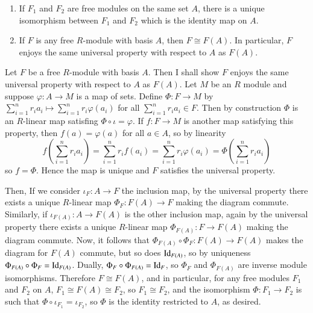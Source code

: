 \documentclass[12pt, a4paper, twoside, openright, titlepage]{book}
\begin{document}
\begin{cor}{}{}
    \leavevmode
    \begin{enumerate}
        \item If $F_1$ and $F_2$ are free modules on the same set $A$, there is a unique isomorphism between $F_1$ and $F_2$ which is the identity map on $A$.
        \item If $F$ is any free $R$-module with basis $A$, then $F\cong F(A)$. In particular, $F$ enjoys the same universal property with respect to $A$ as $F(A)$.
    \end{enumerate}
\end{cor}
\begin{proof*}{}{}
    Let $F$ be a free $R$-module with basis $A$. Then I shall show $F$ enjoys the same universal property with respect to $A$ as $F(A)$. Let $M$ be an $R$ module and suppose $\varphi:A\rightarrow M$ is a map of sets. Define $\Phi:F\rightarrow M$ by $\sum_{i=1}^nr_ia_i \mapsto \sum_{i=1}^nr_i\varphi(a_i)$ for all $\sum_{i=1}^nr_ia_i \in F$. Then by construction $\Phi$ is an $R$-linear map satisfing $\Phi\circ \iota = \varphi$. If $f:F\rightarrow M$ is another map satisfying this property, then $f(a) = \varphi(a)$ for all $a \in A$, so by linearity $$f\left(\sum_{i=1}^nr_ia_i\right) = \sum_{i=1}^nr_if(a_i) = \sum_{i=1}^nr_i\varphi(a_i) = \Phi\left(\sum_{i=1}^nr_ia_i\right)$$
    so $f = \Phi$. Hence the map is unique and $F$ satisfies the universal property. 

    Then, If we consider $\iota_F:A\rightarrow F$ the inclusion map, by the universal property there exists a unique $R$-linear map $\Phi_F:F(A) \rightarrow F$ making the diagram commute. Similarly, if $\iota_{F(A)}:A\rightarrow F(A)$ is the other inclusion map, again by the universal property there exists a unique $R$-linear map $\Phi_{F(A)}:F\rightarrow F(A)$ making the diagram commute. Now, it follows that $\Phi_{F(A)}\circ \Phi_F:F(A) \rightarrow F(A)$ makes the diagram for $F(A)$ commute, but so does $\operatorname{Id}_{F(A)}$, so by uniqueness $\Phi_{F(A)}\circ\Phi_F = \operatorname{Id}_{F(A)}$. Dually, $\Phi_F\circ \Phi_{F(A)} = \operatorname{Id}_F$, so $\Phi_F$ and $\Phi_{F(A)}$ are inverse module isomorphisms. Therefore $F\cong F(A)$, and in particular, for any free modules $F_1$ and $F_2$ on $A$, $F_1 \cong F(A) \cong F_2$, so $F_1 \cong F_2$, and the isomorphism $\Phi:F_1 \rightarrow F_2$ is such that $\Phi\circ \iota_{F_1} = \iota_{F_2}$, so $\Phi$ is the identity restricted to $A$, as desired.
\end{proof*}
\end{document}

